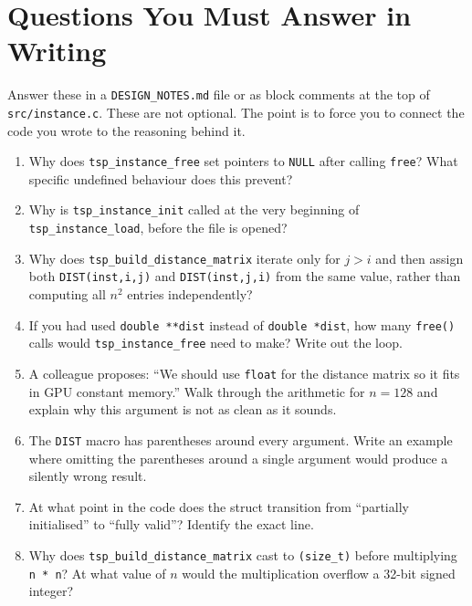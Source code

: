 \documentclass[11pt]{article}
\begin{document}
\newpage

\section{Questions You Must Answer in Writing}

Answer these in a \texttt{DESIGN\_NOTES.md} file or as block comments at the top of \texttt{src/instance.c}. These are not optional. The point is to force you to connect the code you wrote to the reasoning behind it.

\begin{enumerate}[label=\textbf{Q\arabic*.}, leftmargin=*, itemsep=6pt]
  \item Why does \texttt{tsp\_instance\_free} set pointers to \texttt{NULL} after calling \texttt{free}? What specific undefined behaviour does this prevent?

  \item Why is \texttt{tsp\_instance\_init} called at the very beginning of \texttt{tsp\_instance\_load}, before the file is opened?

  \item Why does \texttt{tsp\_build\_distance\_matrix} iterate only for $j > i$ and then assign both \texttt{DIST(inst,i,j)} and \texttt{DIST(inst,j,i)} from the same value, rather than computing all $n^2$ entries independently?

  \item If you had used \texttt{double **dist} instead of \texttt{double *dist}, how many \texttt{free()} calls would \texttt{tsp\_instance\_free} need to make? Write out the loop.

  \item A colleague proposes: ``We should use \texttt{float} for the distance matrix so it fits in GPU constant memory.'' Walk through the arithmetic for $n = 128$ and explain why this argument is not as clean as it sounds.

  \item The \texttt{DIST} macro has parentheses around every argument. Write an example where omitting the parentheses around a single argument would produce a silently wrong result.

  \item At what point in the code does the struct transition from ``partially initialised'' to ``fully valid''? Identify the exact line.

  \item Why does \texttt{tsp\_build\_distance\_matrix} cast to \texttt{(size\_t)} before multiplying \texttt{n * n}? At what value of $n$ would the multiplication overflow a 32-bit signed integer?
\end{enumerate}
\end{document}
